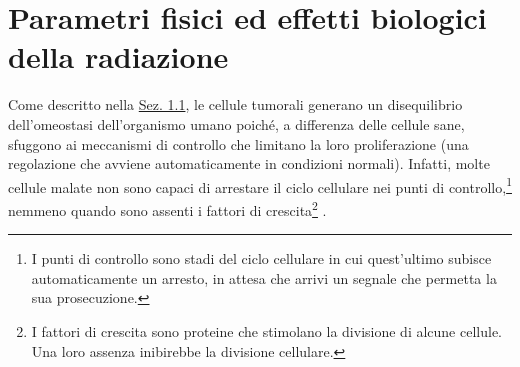 \documentclass[12pt,a4paper,twoside]{report}
\begin{document}
	\section{Parametri fisici ed effetti biologici della radiazione}
	Come descritto nella \hyperref[sec:1.1]{Sez. 1.1}, le cellule tumorali generano un disequilibrio dell'omeostasi dell'organismo umano poiché, a differenza delle cellule sane, sfuggono ai meccanismi di controllo che limitano la loro proliferazione (una regolazione che avviene automaticamente in condizioni normali). Infatti, molte cellule malate non sono capaci di arrestare il ciclo cellulare nei punti di controllo,\footnote{I punti di controllo sono stadi del ciclo cellulare in cui quest'ultimo subisce automaticamente un arresto, in attesa che arrivi un segnale che permetta la sua prosecuzione.} nemmeno quando sono assenti i fattori di crescita\footnote{I fattori di crescita sono proteine che stimolano la divisione di alcune cellule. Una loro assenza inibirebbe la divisione cellulare.} \cite{campbell3anno}.
	
\end{document}

